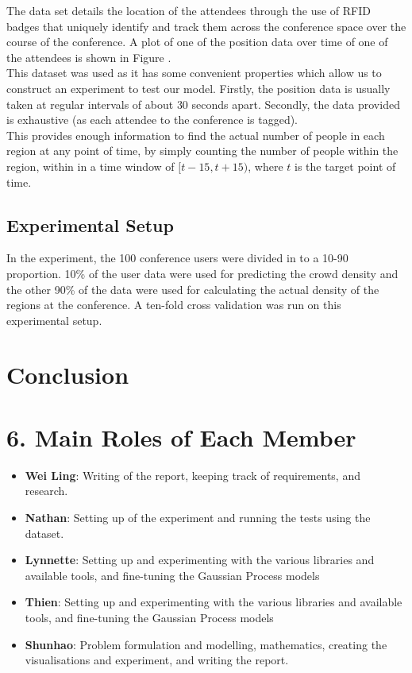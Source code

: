 \documentclass[letterpaper]{article}
\begin{document}
The data set details the location of the attendees through the use of RFID badges that uniquely identify and track them across the conference space over the course of the conference. A plot of one of the position data over time of one of the attendees is shown in Figure .\\


This dataset was used as it has some convenient properties which allow us to construct an experiment to test our model. Firstly, the position data is usually taken at regular intervals of about $30$ seconds apart. Secondly, the data provided is exhaustive (as each attendee to the conference is tagged). \\

This provides enough information to find the actual number of people in each region at any point of time, by simply counting the number of people within the region, within in a time window of $[t-15,t+15)$, where $t$ is the target point of time.

\subsection{Experimental Setup}
In the experiment, the 100 conference users were divided in to a 10-90 proportion. 10\% of the user data were used for predicting the crowd density and the other 90\% of the data were used for calculating the actual density of the regions at the conference. A ten-fold cross validation was run on this experimental setup.


\section{Conclusion}



\section{6. Main Roles of Each Member}
\begin{itemize}
\item \textbf{Wei Ling}: 
Writing of the report, keeping track of requirements, and research.
\item \textbf{Nathan}: 
Setting up of the experiment and running the tests using the dataset.
\item \textbf{Lynnette}: 
Setting up and experimenting with the various libraries and available tools, and fine-tuning the Gaussian Process models
\item \textbf{Thien}: 
Setting up and experimenting with the various libraries and available tools, and fine-tuning the Gaussian Process models
\item \textbf{Shunhao}: 
Problem formulation and modelling, mathematics, creating the visualisations and experiment, and writing the report.
\end{itemize}



\end{document}
